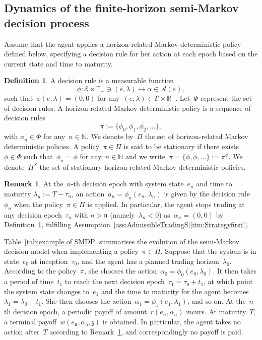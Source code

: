 \documentclass{amsart}[11pt]
\numberwithin{equation}{section}
\theoremstyle{definition}
\newtheorem{definition}[theorem]{Definition}
\newtheorem{remark}[theorem]{Remark}
\newcommand{\RR}{\mathbb{R}}
\newcommand{\NN}{\mathbb{N}}
\newcommand{\Ee}{\mathcal{E}}
\newcommand{\TT}{\mathbb{T}}
\newcommand{\nn}{\mathfrak{n}}
\newcommand{\zz}{\mathfrak{z}}
\newcommand{\Aa}{\mathcal{A}}
\begin{document}
\subsection{Dynamics of the finite-horizon semi-Markov decision process}\label{sec:evolutionSMDP}
Assume that the agent applies a horizon-related Markov deterministic policy defined below,
specifying a decision rule for her action at each epoch based on the current state and time to maturity.
\begin{definition}\label{def:hrpolicy}
A decision rule is a measurable function
$$
\phi: \Ee\times\TT_-\ni(e,\lambda) \mapsto \alpha\in \Aa(e),
$$
such that~$\phi(e, \lambda) = (0, 0)$ for any~$(e, \lambda)\in \Ee\times\RR^-$.
Let~$\Phi$ represent the set of decision rules.
A horizon-related Markov deterministic policy is a sequence of decision rules
$$
\pi := \{\phi_0, \phi_1, \phi_2, \dots\},
$$
with $\phi_n\in\Phi$ for any~$n\in\NN$.
We denote by~$\Pi$ the set of horizon-related Markov deterministic policies.
A policy~$\pi\in\Pi$ is said to be stationary if there exists~$\phi\in\Phi$ such that~$\phi_n = \phi$ for any~$n\in\NN$
and we write~$\pi = \{\phi, \phi, \dots\} := \pi^\phi$.
We denote~$\Pi^S$ the set of stationary horizon-related Markov deterministic policies.
\end{definition}
\begin{remark}\label{rem:StopTrading}
At the~$n$-th decision epoch with system state~$e_n$
and time to maturity $\lambda_n := T - \tau_n$,
an action~$a_n = \phi_n(e_n, \lambda_n)$ is given by the decision rule~$\phi_n$
when the policy~$\pi\in\Pi$ is applied.
In particular,
the agent stops trading at any decision epoch~$\tau_n$ with $n>\nn$ (namely~$\lambda_n <0$) as~$\alpha_n = (0, 0)$ by Definition~\ref{def:hrpolicy},
fulfilling Assumption~\ref{ass:AdmissibleTradingS}\eqref{itm:Strategyfirst'}.
\end{remark}
Table~\ref{tab:example of SMDP} summarises the evolution of the semi-Markov decision model when implementing a policy~$\pi\in\Pi$.
Suppose that the system is in state~$e_0$ at inception~$\tau_0$,
and the agent has a planned trading horizon~$\lambda_0$.
According to the policy~$\pi$, she chooses the action~$\alpha_0 = \phi_0(e_0, \lambda_0)$.
It then takes a period of time~$t_1$ to reach the next decision epoch~$\tau_1 = \tau_0+t_1$,
 at which point the system state changes to~$e_1$ and the time to maturity for the agent becomes~$\lambda_1 = \lambda_0-t_1$.
She then chooses the action~$\alpha_1 = \phi_1(e_1, \lambda_1)$, and so on.
At the~$n$-th decision epoch, a periodic payoff of amount~$r(e_n, \alpha_n)$ incurs.
At maturity~$T$, a terminal payoff~$w(e_{\nn}, \alpha_{\nn},\zz)$ is obtained. 
In particular, the agent takes no action after~$T$ according to Remark~\ref{rem:StopTrading},
and correspondingly no payoff is paid.
\end{document}
